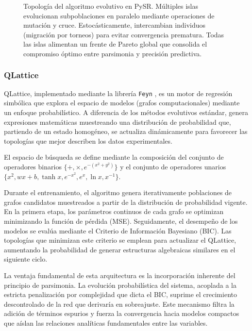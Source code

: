 \documentclass[11pt, a4paper]{article}
\begin{document}
\begin{figure}[H]
    \caption{Topología del algoritmo evolutivo en PySR. Múltiples islas evolucionan subpoblaciones en paralelo mediante operaciones de mutación y cruce. Estocásticamente, intercambian individuos (migración por torneos) para evitar convergencia prematura. Todas las islas alimentan un frente de Pareto global que consolida el compromiso óptimo entre parsimonia y precisión predictiva.}
    \label{fig:pysr_islands}
\end{figure}

\subsubsection{QLattice}

QLattice, implementado mediante la librería \texttt{Feyn} \cite{brolos2021feyn}, es un motor de regresión simbólica que explora el espacio de modelos (grafos computacionales) mediante un enfoque probabilístico. A diferencia de los métodos evolutivos estándar, genera expresiones matemáticas muestreando una distribución de probabilidad que, partiendo de un estado homogéneo, se actualiza dinámicamente para favorecer las topologías que mejor describen los datos experimentales.

El espacio de búsqueda se define mediante la composición del conjunto de operadores binarios $\{+, \times, e^{-(x^2+y^2)}\}$ y el conjunto de operadores unarios $\{x^2, wx+b, \tanh x, e^{-x^2}, e^x, \ln x, x^{-1}\}$. 

Durante el entrenamiento, el algoritmo genera iterativamente poblaciones de grafos candidatos muestreados a partir de la distribución de probabilidad vigente. En la primera etapa, los parámetros continuos de cada grafo se optimizan minimizando la función de pérdida (MSE). Seguidamente, el desempeño de los modelos se evalúa mediante el Criterio de Información Bayesiano (BIC). Las topologías que minimizan este criterio se emplean para actualizar el QLattice, aumentando la probabilidad de generar estructuras algebraicas similares en el siguiente ciclo.

La ventaja fundamental de esta arquitectura es la incorporación inherente del principio de parsimonia. La evolución probabilística del sistema, acoplada a la estricta penalización por complejidad que dicta el BIC, suprime el crecimiento descontrolado de la red que derivaría en sobreajuste. Este mecanismo filtra la adición de términos espurios y fuerza la convergencia hacia modelos compactos que aíslan las relaciones analíticas fundamentales entre las variables.
\end{document}
